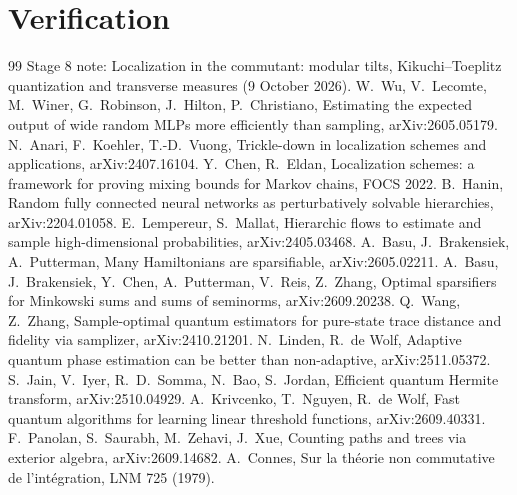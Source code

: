\documentclass[11pt]{article}
\theoremstyle{plain}
\theoremstyle{definition}\newtheorem{definition}[theorem]{Definition}\newtheorem{remark}[theorem]{Remark}\newtheorem{example}[theorem]{Example}
\begin{document}
\section{Verification}


\begin{thebibliography}{99}
 Stage 8 note: Localization in the commutant: modular tilts, Kikuchi--Toeplitz quantization and transverse measures (9 October 2026).
 W.~Wu, V.~Lecomte, M.~Winer, G.~Robinson, J.~Hilton, P.~Christiano, Estimating the expected output of wide random MLPs more efficiently than sampling, arXiv:2605.05179.
 N.~Anari, F.~Koehler, T.-D.~Vuong, Trickle-down in localization schemes and applications, arXiv:2407.16104.
 Y.~Chen, R.~Eldan, Localization schemes: a framework for proving mixing bounds for Markov chains, FOCS 2022.
 B.~Hanin, Random fully connected neural networks as perturbatively solvable hierarchies, arXiv:2204.01058.
 E.~Lempereur, S.~Mallat, Hierarchic flows to estimate and sample high-dimensional probabilities, arXiv:2405.03468.
 A.~Basu, J.~Brakensiek, A.~Putterman, Many Hamiltonians are sparsifiable, arXiv:2605.02211.
 A.~Basu, J.~Brakensiek, Y.~Chen, A.~Putterman, V.~Reis, Z.~Zhang, Optimal sparsifiers for Minkowski sums and sums of seminorms, arXiv:2609.20238.
 Q.~Wang, Z.~Zhang, Sample-optimal quantum estimators for pure-state trace distance and fidelity via samplizer, arXiv:2410.21201.
 N.~Linden, R.~de Wolf, Adaptive quantum phase estimation can be better than non-adaptive, arXiv:2511.05372.
 S.~Jain, V.~Iyer, R.~D.~Somma, N.~Bao, S.~Jordan, Efficient quantum Hermite transform, arXiv:2510.04929.
 A.~Krivcenko, T.~Nguyen, R.~de Wolf, Fast quantum algorithms for learning linear threshold functions, arXiv:2609.40331.
 F.~Panolan, S.~Saurabh, M.~Zehavi, J.~Xue, Counting paths and trees via exterior algebra, arXiv:2609.14682.
 A.~Connes, Sur la th\'eorie non commutative de l'int\'egration, LNM 725 (1979).
\end{thebibliography}
\end{document}
